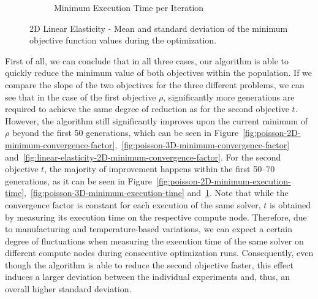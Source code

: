 \begin{figure}
\begin{subfigure}[b]{0.49\textwidth}
		\caption{Minimum Execution Time per Iteration}
		\label{fig:linear-elasticity-2D-minimum-execution-time}
	\end{subfigure}
	\caption{2D Linear Elasticity - Mean and standard deviation of the minimum objective function values during the optimization.}
	\label{fig:linear-elasticity-2D-minimum-objectives}
\end{figure}
First of all, we can conclude that in all three cases, our algorithm is able to quickly reduce the minimum value of both objectives within the population.
If we compare the slope of the two objectives for the three different problems, we can see that in the case of the first objective $\rho$, significantly more generations are required to achieve the same degree of reduction as for the second objective $t$.
However, the algorithm still significantly improves upon the current minimum of $\rho$ beyond the first 50 generations, which can be seen in Figure~\ref{fig:poisson-2D-minimum-convergence-factor},~\ref{fig:poisson-3D-minimum-convergence-factor} and~\ref{fig:linear-elasticity-2D-minimum-convergence-factor}.
For the second objective $t$, the majority of improvement happens within the first 50--70 generations, as it can be seen in Figure~\ref{fig:poisson-2D-minimum-execution-time},~\ref{fig:poisson-3D-minimum-execution-time} and~\ref{fig:linear-elasticity-2D-minimum-execution-time}.
Note that while the convergence factor is constant for each execution of the same solver, $t$ is obtained by measuring its execution time on the respective compute node.
Therefore, due to manufacturing and temperature-based variations, we can expect a certain degree of fluctuations when measuring the execution time of the same solver on different compute nodes during consecutive optimization runs.
Consequently, even though the algorithm is able to reduce the second objective faster, this effect induces a larger deviation between the individual experiments and, thus, an overall higher standard deviation.

